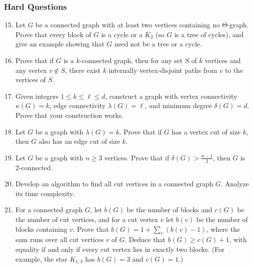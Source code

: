 \documentclass{article}
\theoremstyle{definition}
\begin{document}
\subsubsection{Hard Questions}
\begin{enumerate}\setcounter{enumi}{14}
\item Let $G$ be a connected graph with at least two vertices containing no $\Theta$-graph. Prove that every block of $G$ is a cycle or a $K_2$ (so $G$ is a tree of cycles), and give an example showing that $G$ need not be a tree or a cycle.

\item Prove that if $G$ is a $k$-connected graph, then for any set $S$ of $k$ vertices and any vertex $v \not\in S$, there exist $k$ internally vertex-disjoint paths from $v$ to the vertices of $S$.

\item Given integers $1 \leq k \leq \ell \leq d$, construct a graph with vertex connectivity $\kappa(G) = k$, edge connectivity $\lambda(G) = \ell$, and minimum degree $\delta(G) = d$. Prove that your construction works.

\item Let $G$ be a graph with $\lambda(G) = k$. Prove that if $G$ has a vertex cut of size $k$, then $G$ also has an edge cut of size $k$.

\item Let $G$ be a graph with $n \geq 3$ vertices. Prove that if $\delta(G) > \frac{n-1}{2}$, then $G$ is $2$-connected.

\item Develop an algorithm to find all cut vertices in a connected graph $G$. Analyze its time complexity.

\item For a connected graph $G$, let $b(G)$ be the number of blocks and $c(G)$ be the number of cut vertices, and for a cut vertex $v$ let $b(v)$ be the number of blocks containing $v$. Prove that $b(G) = 1 + \sum_{v} (b(v) - 1)$, where the sum runs over all cut vertices $v$ of $G$. Deduce that $b(G) \geq c(G) + 1$, with equality if and only if every cut vertex lies in exactly two blocks. (For example, the star $K_{1,3}$ has $b(G) = 3$ and $c(G) = 1$.)
\end{enumerate}
\end{document}
